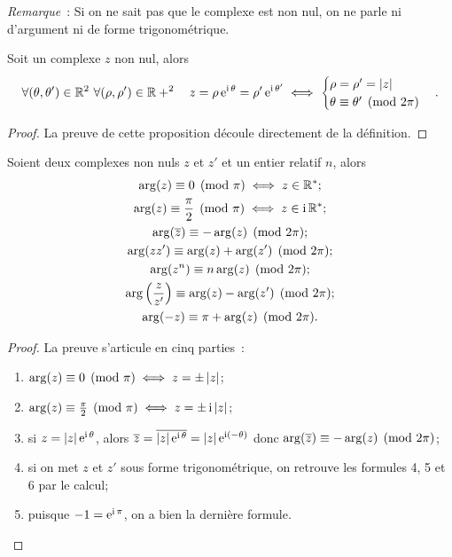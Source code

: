 \emph{Remarque}~: Si on ne sait pas que le complexe est non nul, on ne parle ni d'argument ni de forme trigonométrique.
\begin{prop}
  Soit un complexe $z$ non nul, alors
  \begin{equation}
    \forall (\theta, \theta') \in \mathbb{R}^2 \ \forall (\rho, \rho') \in \mathbb{R}+^2 \quad z=\rho \operatorname{e}^{\operatorname{i} \theta}=\rho' \operatorname{e}^{\operatorname{i} \theta'} \iff
    \begin{cases}
      \rho = \rho' = \left\lvert z\right\rvert \\
      \theta \equiv \theta' \pmod {2\pi}
    \end{cases}.
  \end{equation}
\end{prop}
\begin{proof}
  La preuve de cette proposition découle directement de la définition.
\end{proof}
%
\begin{prop}
  Soient deux complexes non nuls $z$ et $z'$ et un entier relatif $n$, alors
  \begin{gather}
    \arg(z) \equiv 0 \pmod {\pi} \iff z \in \mathbb{R}^*;\\
    \arg(z) \equiv \frac{\pi}{2} \pmod {\pi} \iff z \in \operatorname{i}\mathbb{R}^{*};\\
    \arg(\overline{z}) \equiv -\arg(z) \pmod {2\pi};\\
    \arg(z z') \equiv \arg(z) + \arg(z') \pmod {2\pi};\\
    \arg(z^n) \equiv n \arg(z) \pmod {2\pi};\\
    \arg \left(\frac{z}{z'} \right) \equiv \arg(z) - \arg(z')  \pmod {2\pi};\\
    \arg(-z) \equiv \pi + \arg(z) \pmod {2\pi}.
  \end{gather}
\end{prop}
\begin{proof}
  La preuve s'articule en cinq parties~:
  \begin{enumerate}
  \item $\arg(z) \equiv 0 \pmod {\pi} \iff z = \pm \left\lvert z\right\rvert$;
  \item $\arg(z) \equiv \frac{\pi}{2} \pmod {\pi} \iff z = \pm \operatorname{i} \left\lvert z\right\rvert$;
  \item si $z=\left\lvert z\right\rvert \operatorname{e}^{\operatorname{i} \theta}$, alors $\overline{z}=\overline{|z| \operatorname{e}^{\operatorname{i} \theta}}=|z| \operatorname{e}^{\operatorname{i} (-\theta)}$ donc $\arg(\overline{z}) \equiv -\arg(z) \pmod {2\pi}$;
  \item si on met $z$ et $z'$ sous forme trigonométrique, on retrouve les formules 4, 5 et 6 par le calcul;
  \item puisque $-1=\operatorname{e}^{\operatorname{i} \pi}$, on a bien la dernière formule.
  \end{enumerate}
\end{proof}

